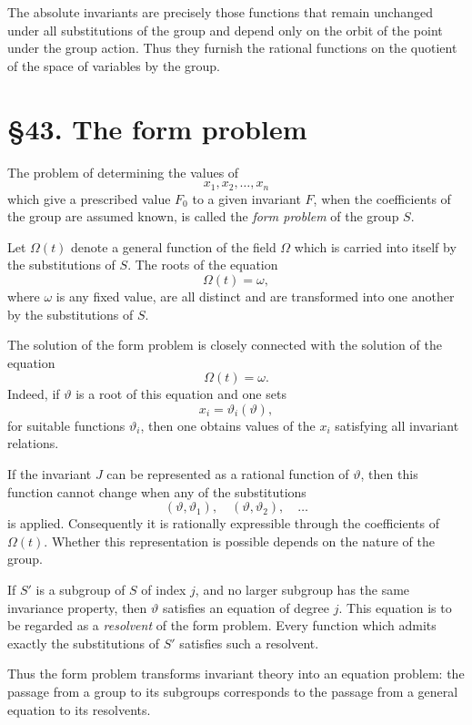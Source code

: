 \documentclass[11pt]{article}
\newcommand{\webersection}[2]{\section*{\S #1. #2}\addcontentsline{toc}{section}{\S #1. #2}}
\begin{document}
The absolute invariants are precisely those functions that remain unchanged under all substitutions of the group and depend only on the orbit of the point under the group action.  Thus they furnish the rational functions on the quotient of the space of variables by the group.

\webersection{43}{The form problem}

The problem of determining the values of
\[
x_1,x_2,\ldots,x_n
\]
which give a prescribed value \(F_0\) to a given invariant \(F\), when the coefficients of the group are assumed known, is called the \emph{form problem} of the group \(S\).

Let \(\Omega(t)\) denote a general function of the field \(\Omega\) which is carried into itself by the substitutions of \(S\).  The roots of the equation
\[
\Omega(t)=\omega,
\]
where \(\omega\) is any fixed value, are all distinct and are transformed into one another by the substitutions of \(S\).

The solution of the form problem is closely connected with the solution of the equation
\[
\Omega(t)=\omega.
\]
Indeed, if \(\vartheta\) is a root of this equation and one sets
\begin{equation}
x_i=\vartheta_i(\vartheta),
\end{equation}
for suitable functions \(\vartheta_i\), then one obtains values of the \(x_i\) satisfying all invariant relations.

If the invariant \(J\) can be represented as a rational function of \(\vartheta\), then this function cannot change when any of the substitutions
\[
(\vartheta,\vartheta_1),\quad
(\vartheta,\vartheta_2),\quad\ldots
\]
is applied.  Consequently it is rationally expressible through the coefficients of \(\Omega(t)\).  Whether this representation is possible depends on the nature of the group.

If \(S'\) is a subgroup of \(S\) of index \(j\), and no larger subgroup has the same invariance property, then \(\vartheta\) satisfies an equation of degree \(j\).  This equation is to be regarded as a \emph{resolvent} of the form problem.  Every function which admits exactly the substitutions of \(S'\) satisfies such a resolvent.

Thus the form problem transforms invariant theory into an equation problem: the passage from a group to its subgroups corresponds to the passage from a general equation to its resolvents.
\end{document}
